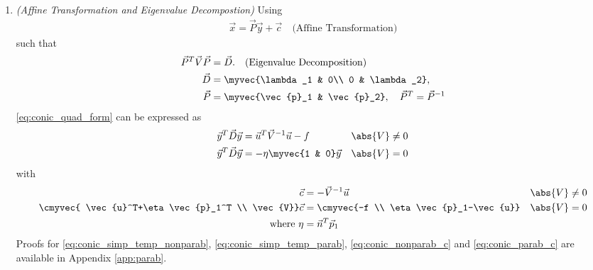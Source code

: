 \renewcommand{\theequation}{\theenumi}
\begin{enumerate}[label=\thesection.\arabic*.,ref=\thesection.\theenumi]

\item {\em (Affine Transformation and Eigenvalue Decompostion)}
Using 
\begin{align}
\vec{x} = \vec{P}\vec{y}+\vec{c} \quad \text{(Affine Transformation)}
\label{eq:conic_affine}
\end{align}
such that 
\begin{align}
\label{eq:conic_parmas_eig_def}
\vec{P}^T\vec{V}\vec{P} &= \vec{D}. \quad \text{(Eigenvalue Decomposition)}
\\
\vec{D} &= \myvec{\lambda_1 & 0\\ 0 & \lambda_2}, 
\\
\vec{P} &= \myvec{\vec{p}_1 & \vec{p}_2}, \quad \vec{P}^T=\vec{P}^{-1}
\end{align}
\eqref{eq:conic_quad_form} can be expressed as
\begin{align}
\label{eq:conic_simp_temp_nonparab}
\vec{y}^T\vec{D}\vec{y} &=  \vec{u}^T\vec{V}^{-1}\vec{u} -f  &  \abs{V} &\ne 0
\\
\vec{y}^T\vec{D}\vec{y} &=  -\eta\myvec{1 & 0}\vec{y}   & \abs{V} &= 0
\label{eq:conic_simp_temp_parab}
\end{align}
with 
\begin{align}
\label{eq:conic_nonparab_c}
\vec{c} &= - \vec{V}^{-1}\vec{u} & \abs{V} &\ne 0
\\
\cmyvec{ \vec{u}^T+\eta\vec{p}_1^T \\ \vec{V}}\vec{c} &= \cmyvec{-f \\ \eta\vec{p}_1-\vec{u}}  &\abs{V} &= 0
\label{eq:conic_parab_c}
\\
\text{where } \eta &=\vec{n}^T\vec{p}_1
\end{align}
\solution
%
 Proofs for \eqref{eq:conic_simp_temp_nonparab},
\eqref{eq:conic_simp_temp_parab}, \eqref{eq:conic_nonparab_c}
 and \eqref{eq:conic_parab_c}
are available in Appendix \ref{app:parab}.

\end{enumerate}

